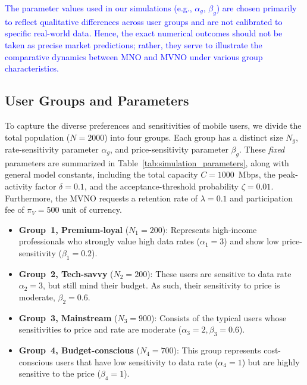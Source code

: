 \documentclass[12pt, draftclsnofoot, onecolumn]{IEEEtran}
\begin{document}
		
		\begin{remark}
			\textcolor{blue} {The parameter values used in our simulations (e.g., \(\alpha_g\), \(\beta_g\)) are chosen primarily to reflect qualitative differences across user groups and are not calibrated to specific real-world data. Hence, the exact numerical outcomes should not be taken as precise market predictions; rather, they serve to illustrate the comparative dynamics between MNO and MVNO under various group characteristics.}  
		\end{remark}
		\vspace{-.75cm}
		\subsection{User Groups and Parameters}
		To capture the diverse preferences and sensitivities of mobile users, we divide the total population ($N=2000$) into four groups. Each group has a distinct size $N_g$, rate-sensitivity parameter $\alpha_g$, and price-sensitivity parameter $\beta_g$. These \emph{fixed} parameters are summarized in Table~\ref{tab:simulation_parameters}, along with general model constants, including the total capacity $C=1000$~Mbps, the peak-activity factor $\delta=0.1$, and the acceptance-threshold probability $\zeta=0.01$. Furthermore, the MVNO requests a retention rate of $\lambda=0.1$ and participation fee of $\pi_V=500$ unit of currency.  
		
		\begin{itemize}
			\item \textbf{Group~1, Premium-loyal} (\(N_1=200\)): Represents high-income  professionals who strongly value high data rates ($\alpha_1=3$) and show low price-sensitivity ($\beta_1=0.2$).
			
			\item \textbf{Group~2, Tech-savvy} (\(N_2=200\)):  These users are sensitive to data rate $\alpha_2=3$, but still mind their budget. As such, their sensitivity to price is moderate, $\beta_2=0.6$.
			
			\item \textbf{Group~3, Mainstream} (\(N_3=900\)): Consists of the typical users whose sensitivities to price and rate are moderate ($\alpha_3=2, \beta_3=0.6$). 
			
			
			\item \textbf{Group~4, Budget-conscious} (\(N_4=700\)): This group represents cost-conscious users that have low sensitivity to data rate ($\alpha_4=1$) but are highly sensitive to the price ($\beta_4=1$). 
			
			
			
			
			
			
		\end{itemize}
		
\end{document}
